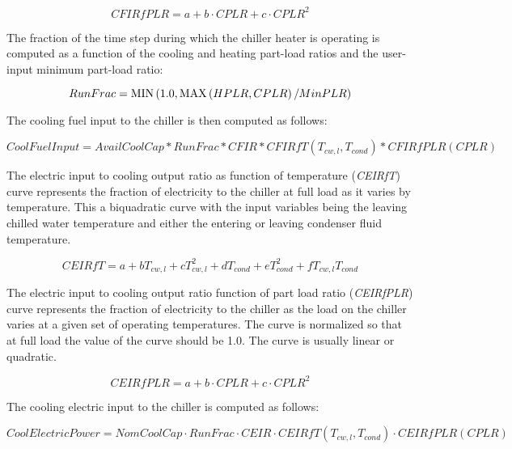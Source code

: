 \begin{equation}
CFIRfPLR = a + b \cdot CPLR + c \cdot CPL{R^2}
\end{equation}

The fraction of the time step during which the chiller heater is operating is computed as a function of the cooling and heating part-load ratios and the user-input minimum part-load ratio:

\begin{equation}
RunFrac = {\mathop{\rm MIN}\nolimits} \left( {1.0,{\mathop{\rm MAX}\nolimits} \left( {HPLR,CPLR} \right)/MinPLR} \right)
\end{equation}

The cooling fuel input to the chiller is then computed as follows:

\begin{equation}
CoolFuelInput = AvailCoolCap * RunFrac * CFIR * CFIRfT(T_{cw,l},T_{cond}) * CFIRfPLR(CPLR)
\end{equation}

The electric input to cooling output ratio as function of temperature (\emph{CEIRfT}) curve represents the fraction of electricity to the chiller at full load as it varies by temperature. This a biquadratic curve with the input variables being the leaving chilled water temperature and either the entering or leaving condenser fluid temperature.

\begin{equation}
CEIRfT = a + b{T_{cw,l}} + cT_{cw,l}^2 + d{T_{cond}} + eT_{cond}^2 + f{T_{cw,l}}{T_{cond}}
\end{equation}

The electric input to cooling output ratio function of part load ratio (\emph{CEIRfPLR}) curve represents the fraction of electricity to the chiller as the load on the chiller varies at a given set of operating temperatures. The curve is normalized so that at full load the value of the curve should be 1.0. The curve is usually linear or quadratic.

\begin{equation}
CEIRfPLR = a + b \cdot CPLR + c \cdot CPL{R^2}
\end{equation}

The cooling electric input to the chiller is computed as follows:

\begin{equation}
CoolElectricPower = NomCoolCap \cdot RunFrac \cdot CEIR \cdot CEIRfT({T_{cw,l}},{T_{cond}}) \cdot CEIRfPLR(CPLR)
\end{equation}

